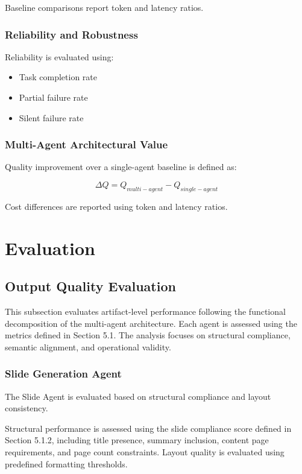 \documentclass[10pt,journal,compsoc]{IEEEtran}
\begin{document}
Baseline comparisons report token and latency ratios.

\subsubsection{Reliability and Robustness}

Reliability is evaluated using:

\begin{itemize}
    \item Task completion rate
    \item Partial failure rate
    \item Silent failure rate
\end{itemize}

\subsubsection{Multi-Agent Architectural Value}

Quality improvement over a single-agent baseline is defined as:

\begin{equation}
\Delta Q = Q_{multi-agent} - Q_{single-agent}
\end{equation}

Cost differences are reported using token and latency ratios.

\section{Evaluation}


\subsection{Output Quality Evaluation}

This subsection evaluates artifact-level performance following the functional decomposition of the multi-agent architecture. Each agent is assessed using the metrics defined in Section 5.1. The analysis focuses on structural compliance, semantic alignment, and operational validity.

\subsubsection{Slide Generation Agent}

The Slide Agent is evaluated based on structural compliance and layout consistency.

Structural performance is assessed using the slide compliance score defined in Section 5.1.2, including title presence, summary inclusion, content page requirements, and page count constraints. Layout quality is evaluated using predefined formatting thresholds.
\end{document}
